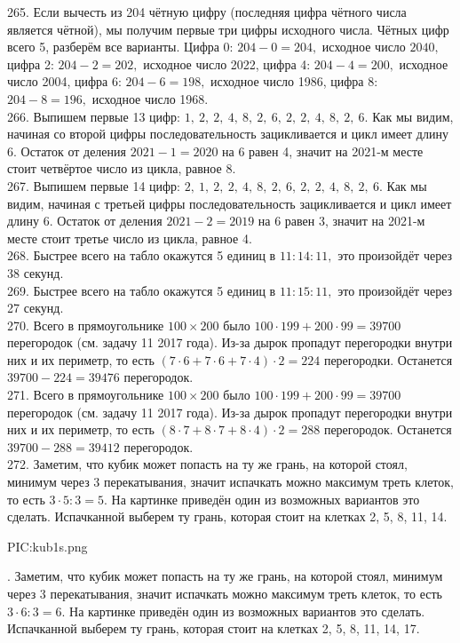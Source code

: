 265. Если вычесть из 204 чётную цифру (последняя цифра чётного числа является чётной), мы получим первые три цифры исходного числа. Чётных цифр всего 5, разберём все варианты. Цифра 0: $204-0=204,$ исходное число $2040,$ цифра 2: $204-2=202,$ исходное число 2022, цифра 4: $204-4=200,$ исходное число 2004, цифра 6: $204-6=198,$ исходное число 1986, цифра 8: $204-8=196,$ исходное число 1968.\\
266. Выпишем первые 13 цифр: $1,\ 2,\ 2,\ 4,\ 8,\ 2,\ 6,\ 2,\ 2,\ 4,\ 8,\ 2,\ 6.$ Как мы видим, начиная со второй цифры последовательность зацикливается и цикл имеет длину 6. Остаток от деления $2021-1=2020$ на 6 равен 4, значит на 2021-м месте стоит четвёртое число из цикла, равное 8.\\
267. Выпишем первые 14 цифр: $2,\ 1,\ 2,\ 2,\ 4,\ 8,\ 2,\ 6,\ 2,\ 2,\ 4,\ 8,\ 2,\ 6.$ Как мы видим, начиная с третьей цифры последовательность зацикливается и цикл имеет длину 6. Остаток от деления $2021-2=2019$ на 6 равен 3, значит на 2021-м месте стоит третье число из цикла, равное 4.\\
268. Быстрее всего на табло окажутся 5 единиц в $11:14:11,$ это произойдёт через 38 секунд.\\
269. Быстрее всего на табло окажутся 5 единиц в $11:15:11,$ это произойдёт через 27 секунд.\\
270. Всего в прямоугольнике $100\times200$ было $100\cdot199+200\cdot99=39700$ перегородок (см. задачу 11 2017 года). Из-за дырок пропадут перегородки внутри них и их периметр, то есть $(7\cdot6+7\cdot6+7\cdot4)\cdot2=224$ перегородки. Останется $39700-224=39476$ перегородок.\\
271. Всего в прямоугольнике $100\times200$ было $100\cdot199+200\cdot99=39700$ перегородок (см. задачу 11 2017 года). Из-за дырок пропадут перегородки внутри них и их периметр, то есть $(8\cdot7+8\cdot7+8\cdot4)\cdot2=288$ перегородок. Останется $39700-288=39412$ перегородок.\\
272. Заметим, что кубик может попасть на ту же грань, на которой стоял, минимум через 3 перекатывания, значит испачкать можно максимум треть клеток, то есть $3\cdot5:3=5.$ На картинке приведён один из возможных вариантов это сделать. Испачканной выберем ту грань, которая стоит на клетках 2, 5, 8, 11, 14.
\begin{center}
{{PIC:kub1s.png}}
\end{center}
\newpage{}. Заметим, что кубик может попасть на ту же грань, на которой стоял, минимум через 3 перекатывания, значит испачкать можно максимум треть клеток, то есть $3\cdot6:3=6.$ На картинке приведён один из возможных вариантов это сделать. Испачканной выберем ту грань, которая стоит на клетках 2, 5, 8, 11, 14, 17.
